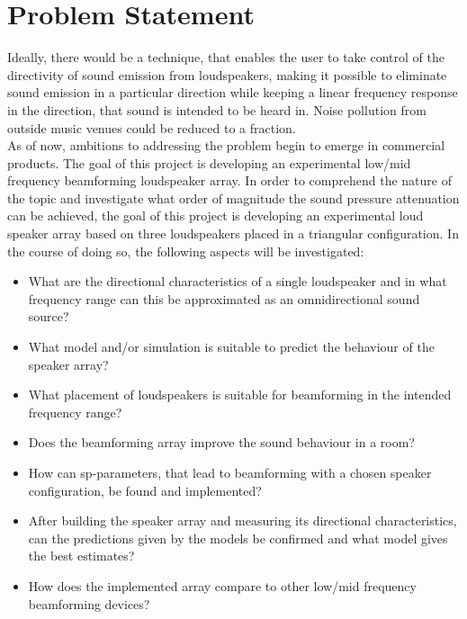 \section{Problem Statement}\label{sec:problem_statement}
Ideally, there would be a technique, that enables the user to take control of the directivity of sound emission from loudspeakers, making it possible to eliminate sound emission in a particular direction while keeping a linear frequency response in the direction, that sound is intended to be heard in. Noise pollution from outside music venues could be reduced to a fraction.\\
As of now, ambitions to addressing the problem begin to emerge in commercial products.
The goal of this project is developing an experimental low/mid frequency beamforming loudspeaker array. In order to comprehend the nature of the topic and investigate what order of magnitude the sound pressure attenuation can be achieved, the goal of this project is developing an experimental loud speaker array based on three loudspeakers placed in a triangular configuration.
In the course of doing so, the following aspects will be investigated:
\begin{itemize}
\item What are the directional characteristics of a single loudspeaker and in what frequency range can this be approximated as an omnidirectional sound source?
\item What model and/or simulation is suitable to predict the behaviour of the speaker array?
\item What placement of loudspeakers is suitable for beamforming in the intended frequency range?
\item Does the beamforming array improve the sound behaviour in a room?
\item How can \gls{sp}-parameters, that lead to beamforming with a chosen speaker configuration, be found and implemented?
\item After building the speaker array and measuring its directional characteristics, can the predictions given by the models be confirmed and what model gives the best estimates?
\item How does the implemented array compare to other low/mid frequency beamforming devices?
\end{itemize}

%



